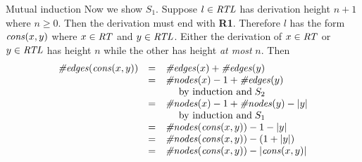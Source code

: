 \begin{wideslide}[bm=,toc=]{Mutual induction}
Now we show $S_1$.
Suppose $l\in\mbox{\it RTL\/}$ has derivation height $n+1$ where $n\geq 0$.
Then the derivation must end with {\bf R1}. 
Therefore $l$ has the form $\mbox{\it cons\/}(x,y)$
where $x\in\mbox{\it RT\/}$ and $y\in\mbox{\it RTL\/}$.
Either the derivation of $x\in\mbox{\it RT\/}$ or $y\in\mbox{\it RTL\/}$ has height $n$ while the other 
has height {\em at most\/} $n$.
Then
\begin{displaymath}
\begin{array}{lll}
\mbox{\it \#edges\/}(\mbox{\it cons\/}(x,y)) & = & \mbox{\it \#edges\/}(x) + \mbox{\it \#edges\/}(y) \\
	& = & \mbox{\it \#nodes\/}(x) - 1 + \mbox{\it \#edges\/}(y) \\
 & & \>\>\>\>\>\>\mbox{\rm by induction and}\;S_2 \\
	& = & \mbox{\it \#nodes\/}(x) - 1 + \mbox{\it \#nodes\/}(y) - |y| \\
 & & \>\>\>\>\>\>\mbox{\rm by induction and}\;S_1 \\
	& = & \mbox{\it \#nodes\/}(\mbox{\it cons\/}(x,y)) - 1 - |y| \\
	& = & \mbox{\it \#nodes\/}(\mbox{\it cons\/}(x,y)) - (1 + |y|) \\
	& = & \mbox{\it \#nodes\/}(\mbox{\it cons\/}(x,y)) - |\mbox{\it cons\/}(x,y)|
\end{array}
\end{displaymath}
\end{wideslide}

